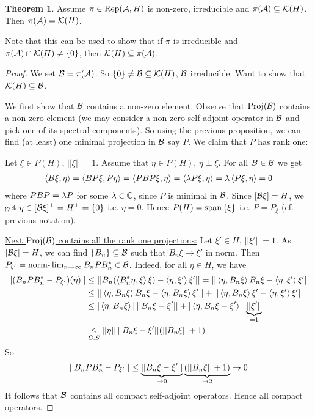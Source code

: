 \documentclass[10pt,english,a4paper]{article}
\theoremstyle{definition}
\newtheorem*{theorem}{Theorem}
\DeclareMathOperator{\Rep}{Rep}
\DeclareMathOperator{\Proj}{Proj}
\begin{document}
\begin{theorem}
    Assume $\pi \in \Rep(\As,H)$ is non-zero, irreducible and $\pi(\mathcal{A}) \subseteq\mathcal{K}(H)$.
Then $\pi(\mathcal{A}) = \mathcal{K}(H)$.
\end{theorem}
Note that this can be used to show that if $\pi$ is irreducible and
$\pi(\mathcal{A})\cap \mathcal{K}(H)\neq \{0\}$, then $\mathcal{K}(H)\subseteq \pi(\mathcal{A})$.
\begin{proof}
    We set $\mathcal{B} = \pi(\mathcal{A})$. So $\{0\}\neq \mathcal{B} \subseteq \mathcal{K}(H)$, $\mathcal{B}$ irreducible.
Want to show that $\mathcal{K}(H)\subseteq \mathcal{B}$. 

We first show that $\mathcal{B}$ contains a non-zero element.
Observe that $\Proj (\Bs)$ contains a non-zero element 
(we may consider a non-zero self-adjoint operator in $\mathcal{B}$ and pick one of its
spectral components). So using the previous proposition, we can find (at least)
one minimal projection in $\mathcal{B}$ say $P$. We claim that \ul{$P$ has rank one:}

Let $\xi \in P(H)$, $||\xi||=1$. Assume that $\eta \in P(H)$, $\eta\perp\xi$.
For all $B \in \mathcal{B}$ we get 
\begin{align*}
    \left\langle B\xi,\eta \right\rangle = \left\langle BP\xi,P\eta \right\rangle = \langle PBP\xi,\eta \rangle = \left\langle \lambda P\xi, \eta \right\rangle =
\lambda\left\langle P\xi,\eta \right\rangle = 0 
\end{align*}
where $PBP = \lambda P$ for some $\lambda \in \mathbb{C}$, since $P$ is minimal in $\mathcal{B}$.
Since $[\mathcal{B} \xi] = H$, we get $\eta \in [\mathcal{B} \xi]^{\perp} = H^{\perp} = \{0\}$ 
i.e. $\eta = 0$. Hence $P(H) = \text{span} \left\{\xi\right\}$ i.e. $P=P_{\xi}$ (cf. previous notation).  

\ul{Next $\Proj (\Bs)$ contains all the rank one projections:}
Let $\xi' \in H$, $||\xi'||=1$. As $[\mathcal{B}\xi] = H$, we can find $\{B_{n}\} \subseteq \mathcal{B}$
such that $B_n\xi \to \xi'$ in norm. Then $P_{\xi'} = \text{norm-}\lim_{n\to\infty}
B_{n}PB_{n}^{*} \in \mathcal{B}$.
Indeed, for all $\eta\in H$, we have
\begin{align*}
    ||(B_nPB_{n}^{*} - P_{\xi'})(\eta)|| 
&\leq ||B_n(\left\langle B_{n}^*\eta,\xi \right\rangle\xi) - \left\langle \eta,\xi' \right\rangle\xi'|| = 
||\left\langle \eta,B_{n}\xi \right\rangle B_n\xi - \left\langle \eta,\xi' \right\rangle\xi'|| \\
&\leq ||\left\langle \eta,B_{n}\xi \right\rangle B_n\xi -\left\langle \eta,B_n\xi \right\rangle\xi'|| 
+||\left\langle \eta,B_n\xi \right\rangle\xi'- \left\langle \eta,\xi' \right\rangle\xi'|| \\
&\leq |\left\langle \eta, B_n\xi \right\rangle|\,||B_n \xi- \xi'|| + |\left\langle \eta,B_n\xi -\xi' \right\rangle|\,\underbrace{||\xi'||}_{=1} \\
&\underset{C.S}{\leq} ||\eta|| \,||B_n\xi-\xi'|| (||B_n\xi|| + 1)
\end{align*}
So 
\begin{align*}
    ||B_nP B_{n}^{*}-P_{\xi'}|| 
    \leq \underbrace{||B_n\xi - \xi'||}_{\to 0} \underbrace{(||B_n\xi||+1)}_{\to 2}\to 0 
\end{align*}
It follows that $\mathcal{B}$ contains all compact self-adjoint operators. Hence all
compact operators. 
\end{proof}
\end{document}
